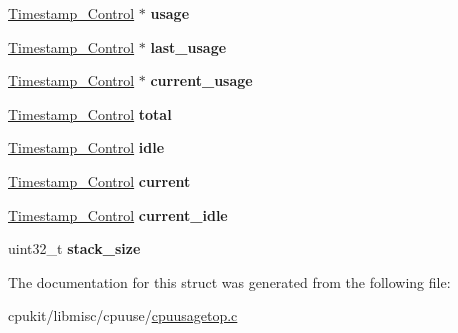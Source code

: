 \begin{DoxyCompactItemize}
\mbox{\hyperlink{group__SuperCoreTimeStamp_ga8508036506d5211c98844c88045e2410}{Timestamp\+\_\+\+Control}} $\ast$ {\bfseries usage}
\item 
\mbox{\label{structrtems__cpu__usage__data_a56342f22fb05328df70ecd89d9ae3b4f}} 
\mbox{\hyperlink{group__SuperCoreTimeStamp_ga8508036506d5211c98844c88045e2410}{Timestamp\+\_\+\+Control}} $\ast$ {\bfseries last\+\_\+usage}
\item 
\mbox{\label{structrtems__cpu__usage__data_a2a65e4c9c3bcd52b8994487d5d57646e}} 
\mbox{\hyperlink{group__SuperCoreTimeStamp_ga8508036506d5211c98844c88045e2410}{Timestamp\+\_\+\+Control}} $\ast$ {\bfseries current\+\_\+usage}
\item 
\mbox{\label{structrtems__cpu__usage__data_ae52d4f85b1ca2bd885926eef03f483e5}} 
\mbox{\hyperlink{group__SuperCoreTimeStamp_ga8508036506d5211c98844c88045e2410}{Timestamp\+\_\+\+Control}} {\bfseries total}
\item 
\mbox{\label{structrtems__cpu__usage__data_a4479d5b5dabf0d2db392c4930d475b44}} 
\mbox{\hyperlink{group__SuperCoreTimeStamp_ga8508036506d5211c98844c88045e2410}{Timestamp\+\_\+\+Control}} {\bfseries idle}
\item 
\mbox{\label{structrtems__cpu__usage__data_aab80ecec89746b94b8ba110cae9a9f55}} 
\mbox{\hyperlink{group__SuperCoreTimeStamp_ga8508036506d5211c98844c88045e2410}{Timestamp\+\_\+\+Control}} {\bfseries current}
\item 
\mbox{\label{structrtems__cpu__usage__data_a2dfe418193952d4c93ebfeddcde69154}} 
\mbox{\hyperlink{group__SuperCoreTimeStamp_ga8508036506d5211c98844c88045e2410}{Timestamp\+\_\+\+Control}} {\bfseries current\+\_\+idle}
\item 
\mbox{\label{structrtems__cpu__usage__data_aeb8777360f408ec0ff41d4493ccdbfa5}} 
uint32\+\_\+t {\bfseries stack\+\_\+size}
\end{DoxyCompactItemize}


The documentation for this struct was generated from the following file\+:\begin{DoxyCompactItemize}
\item 
cpukit/libmisc/cpuuse/\mbox{\hyperlink{cpuusagetop_8c}{cpuusagetop.\+c}}\end{DoxyCompactItemize}
